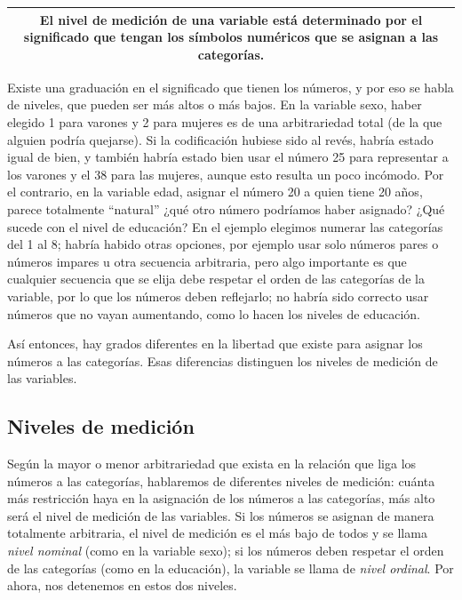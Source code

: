 \documentclass[]{book}
\begin{document}
\begin{longtable}[]{@{}c@{}}
\toprule
\endhead
\begin{minipage}[t]{0.97\columnwidth}\centering
El \textbf{nivel de medición} de una variable está determinado por el significado que tengan los símbolos numéricos que se asignan a las categorías.\strut
\end{minipage}\tabularnewline
\bottomrule
\end{longtable}

Existe una graduación en el significado que tienen los números, y por eso se habla de niveles, que pueden ser más altos o más bajos. En la variable sexo, haber elegido 1 para varones y 2 para mujeres es de una arbitrariedad total (de la que alguien podría quejarse). Si la codificación hubiese sido al revés, habría estado igual de bien, y también habría estado bien usar el número 25 para representar a los varones y el 38 para las mujeres, aunque esto resulta un poco incómodo. Por el contrario, en la variable edad, asignar el número 20 a quien tiene 20 años, parece totalmente ``natural'' ¿qué otro número podríamos haber asignado? ¿Qué sucede con el nivel de educación? En el ejemplo elegimos numerar las categorías del 1 al 8; habría habido otras opciones, por ejemplo usar solo números pares o números impares u otra secuencia arbitraria, pero algo importante es que cualquier secuencia que se elija debe respetar el orden de las categorías de la variable, por lo que los números deben reflejarlo; no habría sido correcto usar números que no vayan aumentando, como lo hacen los niveles de educación.

Así entonces, hay grados diferentes en la libertad que existe para asignar los números a las categorías. Esas diferencias distinguen los niveles de medición de las variables.

\hypertarget{niveles-de-medicion}{%
\subsection{Niveles de medición}\label{niveles-de-medicion}}

Según la mayor o menor arbitrariedad que exista en la relación que liga los números a las categorías, hablaremos de diferentes niveles de medición: cuánta más restricción haya en la asignación de los números a las categorías, más alto será el nivel de medición de las variables. Si los números se asignan de manera totalmente arbitraria, el nivel de medición es el más bajo de todos y se llama \emph{nivel nominal} (como en la variable sexo); si los números deben respetar el orden de las categorías (como en la educación), la variable se llama de \emph{nivel ordinal}. Por ahora, nos detenemos en estos dos niveles.
\end{document}

